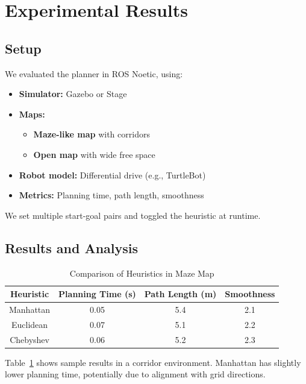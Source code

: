 \documentclass[letterpaper, 10 pt, conference]{ieeeconf}
\begin{document}
\section{Experimental Results}\label{sec:experiments}

\subsection{Setup}
We evaluated the planner in ROS Noetic, using:
\begin{itemize}
    \item \textbf{Simulator:} Gazebo or Stage
    \item \textbf{Maps:} 
        \begin{itemize}
            \item \textbf{Maze-like map} with corridors
            \item \textbf{Open map} with wide free space
        \end{itemize}
    \item \textbf{Robot model:} Differential drive (e.g., TurtleBot)
    \item \textbf{Metrics:} Planning time, path length, smoothness
\end{itemize}
We set multiple start-goal pairs and toggled the heuristic at runtime.

\subsection{Results and Analysis}
\begin{table}[!ht]
\centering
\footnotesize
\caption{Comparison of Heuristics in Maze Map}
\label{table:maze}
\begin{tabular}{|c|c|c|c|}
\hline
\textbf{Heuristic} & \textbf{Planning Time (s)} & \textbf{Path Length (m)} & \textbf{Smoothness}\\
\hline
Manhattan & 0.05 & 5.4 & 2.1 \\
Euclidean & 0.07 & 5.1 & 2.2 \\
Chebyshev & 0.06 & 5.2 & 2.3 \\
\hline
\end{tabular}
\end{table}

Table~\ref{table:maze} shows sample results in a corridor environment. 
Manhattan has slightly lower planning time, potentially due to alignment 
with grid directions.
\end{document}
